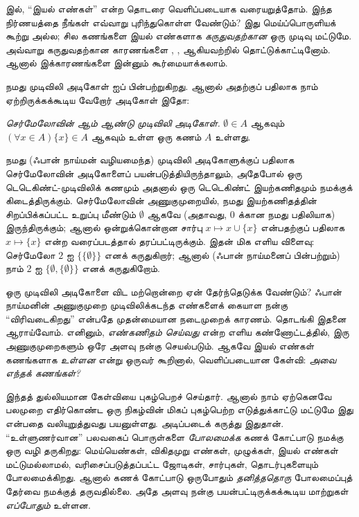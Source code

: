 \documentclass[../../../include/open-logic-section]{subfiles}
\begin{document}


 இல், ``இயல் எண்கள்'' என்ற தொடரை
வெளிப்படையாக வரையறுத்தோம். இந்த நிர்ணயத்தை நீங்கள் எவ்வாறு புரிந்துகொள்ள
வேண்டும்? இது மெய்ப்பொருளியக் கூற்று அல்ல; சில கணங்களை இயல் எண்களாக
\emph{கருதுவதற்கான} ஒரு முடிவு மட்டுமே. அவ்வாறு கருதுவதற்கான காரணங்களை
, ,
 ஆகியவற்றில் தொட்டுக்காட்டினோம்.
ஆனால் இக்காரணங்களை இன்னும் கூர்மையாக்கலாம்.

நமது முடிவிலி அடிகோள் \citet{VonNeumann1925} ஐப் பின்பற்றுகிறது. ஆனால்
அதற்குப் பதிலாக நாம் ஏற்றிருக்கக்கூடிய வேறோர் அடிகோள் இதோ:

\begin{defish}
\emph{செர்மேலோவின் \citeyear{Zermelo1908Untersuchungen} ஆம் ஆண்டு
முடிவிலி அடிகோள்.} $\emptyset \in A$ ஆகவும்
$(\forall x \in A)\{x\} \in A$ ஆகவும் உள்ள ஒரு கணம் $A$ உள்ளது.
\end{defish}

நமது (ஃபான் நாய்மன் வழியமைந்த) முடிவிலி அடிகோளுக்குப் பதிலாக
செர்மேலோவின் அடிகோளைப் பயன்படுத்தியிருந்தாலும், அதேபோல் ஒரு
டெடெகிண்ட்-முடிவிலிக் கணமும் அதனால் ஒரு டெடெகிண்ட் இயற்கணிதமும் நமக்குக்
கிடைத்திருக்கும். செர்மேலோவின் அணுகுமுறையில், நமது இயற்கணிதத்தின்
சிறப்பிக்கப்பட்ட உறுப்பு மீண்டும் $\emptyset$ ஆகவே (அதாவது, $0$ க்கான
நமது பதிலியாக) இருந்திருக்கும்; ஆனால் ஒன்றுக்கொன்றான சார்பு
$x \mapsto x \cup \{x\}$ என்பதற்குப் பதிலாக $x \mapsto \{x\}$ என்ற
வரைப்படத்தால் தரப்பட்டிருக்கும். இதன் மிக எளிய விளைவு: செர்மேலோ
$2$ ஐ $\{\{\emptyset\}\}$ எனக் கருதுகிறார்; ஆனால் (ஃபான் நாய்மனைப்
பின்பற்றும்) நாம் $2$ ஐ $\{\emptyset, \{\emptyset\}\}$ எனக் கருதுகிறோம்.

ஒரு முடிவிலி அடிகோளை விட மற்றொன்றை ஏன் தேர்ந்தெடுக்க வேண்டும்? ஃபான்
நாய்மனின் அணுகுமுறை முடிவிலிக்கடந்த எண்களைக் கையாள நன்கு ``விரிவடைகிறது''
என்பதே முதன்மையான நடைமுறைக் காரணம்.  தொடங்கி
இதனை ஆராய்வோம். எனினும், \emph{எண்கணிதம் செய்வது} என்ற எளிய
கண்ணோட்டத்தில், இரு அணுகுமுறைகளும் ஒரே அளவு நன்கு செயல்படும். ஆகவே இயல்
எண்கள் கணங்களாக \emph{உள்ளன} என்று ஒருவர் கூறினால், வெளிப்படையான கேள்வி:
\emph{அவை எந்தக் கணங்கள்?}

இந்தத் துல்லியமான கேள்வியை \citet{Benacerraf1965} புகழ்பெறச் செய்தார்.
ஆனால் நாம் ஏற்கெனவே பலமுறை எதிர்கொண்ட ஒரு நிகழ்வின் மிகப் புகழ்பெற்ற
எடுத்துக்காட்டு மட்டுமே இது என்பதை வலியுறுத்துவது பயனுள்ளது. அடிப்படைக்
கருத்து இதுதான். ``உள்ளுணர்வான'' பலவகைப் பொருள்களை \emph{போலமைக்க} கணக்
கோட்பாடு நமக்கு ஒரு வழி தருகிறது: மெய்யெண்கள், விகிதமுறு எண்கள், முழுக்கள்,
இயல் எண்கள் மட்டுமல்லாமல், வரிசைப்படுத்தப்பட்ட ஜோடிகள், சார்புகள்,
தொடர்புகளையும் போலமைக்கிறது. ஆனால் கணக் கோட்பாடு ஒருபோதும்
\emph{தனித்ததொரு} போலமைப்புத் தேர்வை நமக்குத் தருவதில்லை. அதே அளவு
நன்கு பயன்பட்டிருக்கக்கூடிய மாற்றுகள் \emph{எப்போதும்} உள்ளன.
\end{document}
